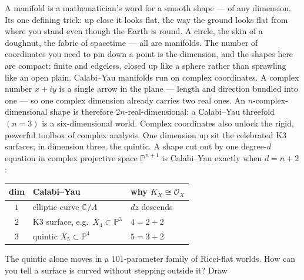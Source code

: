 \documentclass[12pt]{article}
\newcommand{\auterm}[1]{#1}
\newcommand{\auhead}[1]{#1}
\newcommand{\SideBody}{\fontsize{20.7}{28.8}\selectfont}
\newcommand{\PosterSmall}{\fontsize{17.4}{23.8}\selectfont}
\begin{document}
\newlength{\BodyH}\setlength{\BodyH}{49.51cm}
\begin{minipage}[t][\BodyH][s]{0.285\textwidth}
\SideBody

A \auterm{manifold} is a mathematician's word for a smooth shape --- of
any dimension. Its one defining trick: up close it looks \auterm{flat},
the way the ground looks flat from where you stand even though the
Earth is round. A circle, the skin of a doughnut, the fabric of
spacetime --- all are manifolds. The number of coordinates you need to
pin down a point is the \auterm{dimension}, and the shapes here are
\auterm{compact}: finite and edgeless, closed up like a sphere rather
than sprawling like an open plain.
\vfill
{}
Calabi--Yau manifolds run on \auterm{complex} coordinates. A complex
number $x + iy$ is a single arrow in the plane --- length and
direction bundled into one --- so one complex dimension already
carries two real ones. An $n$-complex-dimensional shape is therefore
$2n$-real-dimensional: a Calabi--Yau \auterm{threefold} $(n = 3)$ is a
\auterm{six}-dimensional world. Complex coordinates also unlock the
rigid, powerful toolbox of complex analysis.
\vfill
{}
One dimension up sit the celebrated \auterm{K3 surfaces}; in dimension
three, the \auterm{quintic}. A shape cut out by one degree-$d$
equation in complex projective space $\mathbb{P}^{n+1}$ is
Calabi--Yau exactly when $d = n+2$:
\begin{center}
\PosterSmall
{}%
\begin{tabular}{c l l}
  \toprule
  \auhead{dim} & \auhead{Calabi--Yau} & \auhead{why $K_X \cong \mathcal{O}_X$} \\
  \midrule
  $1$ & elliptic curve $\mathbb{C}/\Lambda$ & $dz$ descends \\
  $2$ & K3 surface, e.g.\ $X_4 \subset \mathbb{P}^3$ & $4 = 2+2$ \\
  $3$ & quintic $X_5 \subset \mathbb{P}^4$ & $5 = 3+2$ \\
  \bottomrule
\end{tabular}
\end{center}
\vspace{0.05em}
The quintic alone moves in a $101$-parameter family of Ricci-flat
worlds.
\vfill
{}
How can you tell a surface is curved without stepping outside it? Draw

\end{minipage}
\end{document}
